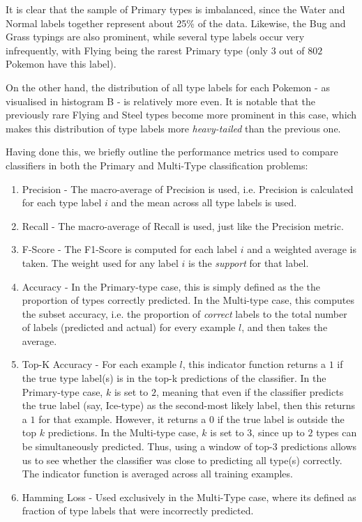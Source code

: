 \documentclass{winnower}
\begin{document}
It is clear that the sample of Primary types is imbalanced, since the Water and Normal labels together represent about 25\% of the data. Likewise, the Bug and Grass typings are also prominent, while several type labels occur very infrequently, with Flying being the rarest Primary type (only $3$ out of $802$ Pokemon have this label). 

On the other hand, the distribution of all type labels for each Pokemon - as visualised in histogram B - is relatively more even. It is notable that the previously rare Flying and Steel types become more prominent in this case, which makes this distribution of type labels more \textit{heavy-tailed} than the previous one. 

Having done this, we briefly outline the performance metrics used to compare classifiers in both the Primary and Multi-Type classification problems:

\begin{enumerate}
\item  Precision - The macro-average of Precision is used, i.e. Precision is calculated for each type label $i$ and the mean across all type labels is used.
\item Recall - The macro-average of Recall is used, just like the Precision metric.
\item F-Score - The F1-Score is computed for each label $i$ and a weighted average is taken. The weight used for any label $i$ is the \textit{support} for that label.
\item Accuracy - In the Primary-type case, this is simply defined as the the proportion of types correctly predicted. In the Multi-type case, this computes the subset accuracy, i.e. the proportion of \textit{correct} labels to the total number of labels (predicted and actual) for every example $l$, and then takes the average.
\item Top-K Accuracy - For each example $l$, this indicator function returns a $1$ if the true type label(s) is in the top-k predictions of the classifier. In the Primary-type case, $k$ is set to $2$, meaning that even if the classifier predicts the true label (say, Ice-type) as the second-most likely label, then this returns a $1$ for that example. However, it returns a $0$ if the true label is outside the top $k$ predictions. In the Multi-type case, $k$ is set to $3$, since up to $2$ types can be simultaneously predicted. Thus, using a window of top-3 predictions allows us to see whether the classifier was close to predicting all type(s) correctly.  The indicator function is averaged across all training examples.
\item  Hamming Loss - Used exclusively in the Multi-Type case, where its defined as fraction of type labels that were incorrectly predicted.
\end{enumerate}
\end{document}
